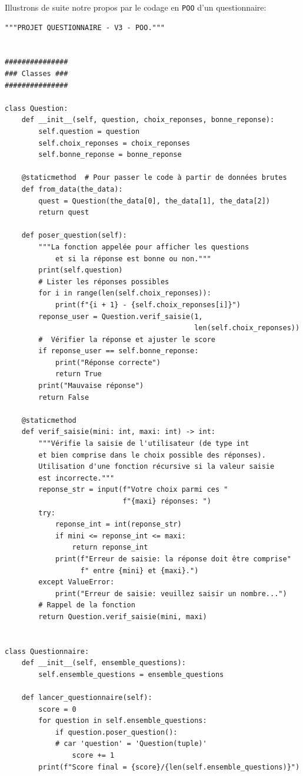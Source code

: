 \documentclass[a4paper,11pt]{book}
\begin{document}
Illustrons de suite notre propos par le codage en \texttt{POO} d'un questionnaire:
\begin{lstlisting}
"""PROJET QUESTIONNAIRE - V3 - POO."""


###############
### Classes ###
###############

class Question:
    def __init__(self, question, choix_reponses, bonne_reponse):
        self.question = question
        self.choix_reponses = choix_reponses
        self.bonne_reponse = bonne_reponse

    @staticmethod  # Pour passer le code à partir de données brutes
    def from_data(the_data):
        quest = Question(the_data[0], the_data[1], the_data[2])
        return quest

    def poser_question(self):
        """La fonction appelée pour afficher les questions
            et si la réponse est bonne ou non."""
        print(self.question)
        # Lister les réponses possibles
        for i in range(len(self.choix_reponses)):  
            print(f"{i + 1} - {self.choix_reponses[i]}")
        reponse_user = Question.verif_saisie(1,
                                             len(self.choix_reponses))
        #  Vérifier la réponse et ajuster le score
        if reponse_user == self.bonne_reponse:
            print("Réponse correcte")
            return True
        print("Mauvaise réponse")
        return False

    @staticmethod
    def verif_saisie(mini: int, maxi: int) -> int:
        """Vérifie la saisie de l'utilisateur (de type int
        et bien comprise dans le choix possible des réponses).
        Utilisation d'une fonction récursive si la valeur saisie
        est incorrecte."""
        reponse_str = input(f"Votre choix parmi ces "
                            f"{maxi} réponses: ")
        try:
            reponse_int = int(reponse_str)
            if mini <= reponse_int <= maxi:
                return reponse_int
            print(f"Erreur de saisie: la réponse doit être comprise"
                  f" entre {mini} et {maxi}.")
        except ValueError:
            print("Erreur de saisie: veuillez saisir un nombre...")
        # Rappel de la fonction
        return Question.verif_saisie(mini, maxi)  


class Questionnaire:
    def __init__(self, ensemble_questions):
        self.ensemble_questions = ensemble_questions

    def lancer_questionnaire(self):
        score = 0
        for question in self.ensemble_questions:
            if question.poser_question():  
            # car 'question' = 'Question(tuple)'
                score += 1
        print(f"Score final = {score}/{len(self.ensemble_questions)}")



\end{lstlisting}
\end{document}
